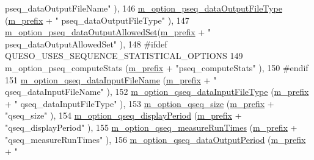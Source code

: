 \begin{DoxyCode}
{      pseq\_dataOutputFileName"}    ),
146   \hyperlink{class_q_u_e_s_o_1_1_monte_carlo_s_g_options_af894e246867b1b73f66322df656c44c8}{m\_option\_pseq\_dataOutputFileType}  (\hyperlink{class_q_u_e_s_o_1_1_monte_carlo_s_g_options_ac640fa60af7134d4113e9b7481a34f6c}{m\_prefix} + \textcolor{stringliteral}{"
      pseq\_dataOutputFileType"}    ),
147   \hyperlink{class_q_u_e_s_o_1_1_monte_carlo_s_g_options_a496b1325324965abbeffd3ef8b919975}{m\_option\_pseq\_dataOutputAllowedSet}(\hyperlink{class_q_u_e_s_o_1_1_monte_carlo_s_g_options_ac640fa60af7134d4113e9b7481a34f6c}{m\_prefix} + \textcolor{stringliteral}{"
      pseq\_dataOutputAllowedSet"}  ),
148 \textcolor{preprocessor}{#ifdef QUESO\_USES\_SEQUENCE\_STATISTICAL\_OPTIONS}
149 \textcolor{preprocessor}{}  m\_option\_pseq\_computeStats        (\hyperlink{class_q_u_e_s_o_1_1_monte_carlo_s_g_options_ac640fa60af7134d4113e9b7481a34f6c}{m\_prefix} + \textcolor{stringliteral}{"pseq\_computeStats"}          ),
150 \textcolor{preprocessor}{#endif}
151 \textcolor{preprocessor}{}  \hyperlink{class_q_u_e_s_o_1_1_monte_carlo_s_g_options_adfa1e97f82f761f277721e3002fa5be5}{m\_option\_qseq\_dataInputFileName}   (\hyperlink{class_q_u_e_s_o_1_1_monte_carlo_s_g_options_ac640fa60af7134d4113e9b7481a34f6c}{m\_prefix} + \textcolor{stringliteral}{"
      qseq\_dataInputFileName"}     ),
152   \hyperlink{class_q_u_e_s_o_1_1_monte_carlo_s_g_options_a93530ee50a7e47ad57b46ca6cf04a60c}{m\_option\_qseq\_dataInputFileType}   (\hyperlink{class_q_u_e_s_o_1_1_monte_carlo_s_g_options_ac640fa60af7134d4113e9b7481a34f6c}{m\_prefix} + \textcolor{stringliteral}{"
      qseq\_dataInputFileType"}     ),
153   \hyperlink{class_q_u_e_s_o_1_1_monte_carlo_s_g_options_ab720df7bb4ec0dbffd231de174d30423}{m\_option\_qseq\_size}                (\hyperlink{class_q_u_e_s_o_1_1_monte_carlo_s_g_options_ac640fa60af7134d4113e9b7481a34f6c}{m\_prefix} + \textcolor{stringliteral}{"qseq\_size"}                  ),
154   \hyperlink{class_q_u_e_s_o_1_1_monte_carlo_s_g_options_a14d5adea03855e45e535cf10cf8ea3ae}{m\_option\_qseq\_displayPeriod}       (\hyperlink{class_q_u_e_s_o_1_1_monte_carlo_s_g_options_ac640fa60af7134d4113e9b7481a34f6c}{m\_prefix} + \textcolor{stringliteral}{"qseq\_displayPeriod"}    
           ),
155   \hyperlink{class_q_u_e_s_o_1_1_monte_carlo_s_g_options_a16456d0bcab4d4aca08b02f0ce123b07}{m\_option\_qseq\_measureRunTimes}     (\hyperlink{class_q_u_e_s_o_1_1_monte_carlo_s_g_options_ac640fa60af7134d4113e9b7481a34f6c}{m\_prefix} + \textcolor{stringliteral}{"qseq\_measureRunTimes"}
             ),
156   \hyperlink{class_q_u_e_s_o_1_1_monte_carlo_s_g_options_a604e3546503d8b7f9a8e0c48922b2ed7}{m\_option\_qseq\_dataOutputPeriod}    (\hyperlink{class_q_u_e_s_o_1_1_monte_carlo_s_g_options_ac640fa60af7134d4113e9b7481a34f6c}{m\_prefix} + \textcolor{stringliteral}{"
}
\end{DoxyCode}
